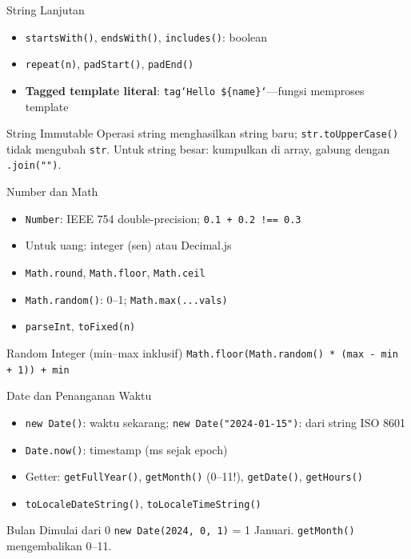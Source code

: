 \documentclass[handout]{beamer}
\begin{document}
\begin{frame}{String Lanjutan}
	\begin{itemize}
		\item \texttt{startsWith()}, \texttt{endsWith()}, \texttt{includes()}: boolean
		\item \texttt{repeat(n)}, \texttt{padStart()}, \texttt{padEnd()}
		\item \textbf{Tagged template literal}: \texttt{tag`Hello \$\{name\}`}---fungsi memproses template
	\end{itemize}
	\begin{block}{String Immutable}
		Operasi string menghasilkan string baru; \texttt{str.toUpperCase()} tidak mengubah \texttt{str}. Untuk string besar: kumpulkan di array, gabung dengan \texttt{.join("")}.
	\end{block}
\end{frame}

\begin{frame}{Number dan Math}
	\begin{itemize}
		\item \texttt{Number}: IEEE 754 double-precision; \texttt{0.1 + 0.2 !== 0.3}
		\item Untuk uang: integer (sen) atau Decimal.js
		\item \texttt{Math.round}, \texttt{Math.floor}, \texttt{Math.ceil}
		\item \texttt{Math.random()}: 0--1; \texttt{Math.max(...vals)}
		\item \texttt{parseInt}, \texttt{toFixed(n)}
	\end{itemize}
	\begin{block}{Random Integer (min--max inklusif)}
		\texttt{Math.floor(Math.random() * (max - min + 1)) + min}
	\end{block}
\end{frame}

\begin{frame}{Date dan Penanganan Waktu}
	\begin{itemize}
		\item \texttt{new Date()}: waktu sekarang; \texttt{new Date("2024-01-15")}: dari string ISO 8601
		\item \texttt{Date.now()}: timestamp (ms sejak epoch)
		\item Getter: \texttt{getFullYear()}, \texttt{getMonth()} (0--11!), \texttt{getDate()}, \texttt{getHours()}
		\item \texttt{toLocaleDateString()}, \texttt{toLocaleTimeString()}
	\end{itemize}
	\begin{block}{Bulan Dimulai dari 0}
		\texttt{new Date(2024, 0, 1)} = 1 Januari. \texttt{getMonth()} mengembalikan 0--11.
	\end{block}
\end{frame}
\end{document}
